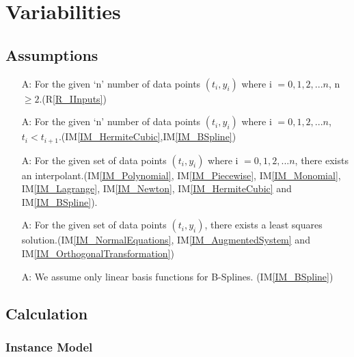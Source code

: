 \documentclass[12pt]{article}
\newcounter{assumpnum} %
\newcommand{\iref}[1]{IM\ref{#1}}
\newcommand{\rref}[1]{R\ref{#1}}
\begin{document}
\section{Variabilities}

\subsection{Assumptions}

\begin{itemize}

\item[A\refstepcounter{assumpnum}\theassumpnum \label{A_data}:] For the given `n' number of data points $(t_i,y_i)$ where i $= 0,1,2,...n$, n $\geq 2$.(\rref{R_IInputs})
\item[A\refstepcounter{assumpnum}\theassumpnum \label{A_dataConstraint}:] For the given `n' number of data points $(t_i,y_i)$ where i $= 0,1,2,...n$, $t_i < t_{i+1}$.(\iref{IM_HermiteCubic},\iref{IM_BSpline})
\item[A\refstepcounter{assumpnum}\theassumpnum \label{A_Interpolation}:] For the given set of data points $(t_i,y_i)$ where i $= 0,1,2,...n$,  there exists an interpolant.(\iref{IM_Polynomial}, \iref{IM_Piecewise}, \iref{IM_Monomial}, \iref{IM_Lagrange}, \iref{IM_Newton}, \iref{IM_HermiteCubic} and \iref{IM_BSpline}).

\item[A\refstepcounter{assumpnum}\theassumpnum \label{A_Regression}:] For the given set of data points $(t_i,y_i)$, there exists a least squares solution.(\iref{IM_NormalEquations}, \iref{IM_AugmentedSystem} and \iref{IM_OrthogonalTransformation})
\item[A\refstepcounter{assumpnum}\theassumpnum \label{A_BSplines}:] We assume only linear basis functions for B-Splines. (\iref{IM_BSpline}) 


\end{itemize}

\subsection{Calculation} \label{sec_Calculation}



\subsubsection{Instance Model} \label{PolynomialInterpolation}    
\end{document}
